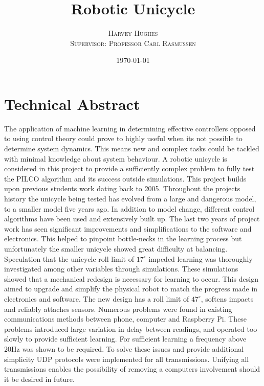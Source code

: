 \documentclass[twoside,twocolumn,12pt]{article}
\title{Robotic Unicycle} %
\author{%
\textsc{Harvey Hughes} \\
\textsc{Supervisor: Professor Carl Rasmussen} \\
}
\date{\today} %
\begin{document}
\onecolumn
\maketitle


\section*{Technical Abstract}
The application of machine learning in determining effective controllers opposed to using control theory could prove to highly useful when its not possible to determine system dynamics. This means new and complex tasks could be tackled with minimal knowledge about system behaviour.  A robotic unicycle is considered in this project to provide a sufficiently complex problem to fully test the PILCO algorithm and its success outside simulations.
\newline
\newline
This project builds upon previous students work dating back to 2005. Throughout the projects history the unicycle being tested has evolved from a large and dangerous model, to a smaller model five years ago. In addition to model change, different control algorithms have been used and extensively built up. 
\newline
\newline
The last two years of project work has seen significant improvements and simplifications to the software and electronics. This helped to pinpoint bottle-necks in the learning process but unfortunately the smaller unicycle showed great difficulty at balancing.
\newline
\newline
Speculation that the unicycle roll limit of $17^{\circ}$ impeded learning was thoroughly investigated among other variables through simulations. These simulations showed that a mechanical redesign is necessary for learning to occur. This design aimed to upgrade and simplify the physical robot to match the progress made in electronics and software. The new design has a roll limit of $47^{\circ}$, softens impacts and reliably attaches sensors. 
\newline
\newline
Numerous problems were found in existing communications methods between phone, computer and Raspberry Pi. These problems introduced large variation in delay between readings, and operated too slowly to provide sufficient learning. For sufficient learning a frequency above 20Hz was shown to be required. To solve these issues and provide additional simplicity UDP protocols were implemented for all transmissions. Unifying all transmissions enables the possibility of removing a computers involvement should it be desired in future.
\end{document}
